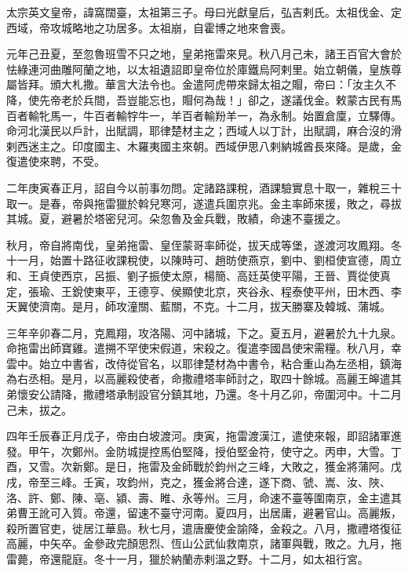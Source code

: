 
\begin{pinyinscope}

 太宗英文皇帝，諱窩闊臺，太祖第三子。母曰光獻皇后，弘吉剌氏。太祖伐金、定西域，帝攻城略地之功居多。太祖崩，自霍博之地來會喪。



 元年己丑夏，至忽魯班雪不只之地，皇弟拖雷來見。秋八月己未，諸王百官大會於怯綠連河曲雕阿蘭之地，以太祖遺詔即皇帝位於庫鐵烏阿剌里。始立朝儀，皇族尊屬皆拜。頒大札撒。華言大法令也。金遣阿虎帶來歸太祖之賵，帝曰：「汝主久不降，使先帝老於兵間，吾豈能忘也，賵何為哉！」卻之，遂議伐金。敕蒙古民有馬百者輸牝馬一，牛百者輸牸牛一，羊百者輸羒羊一，為永制。始置倉廩，立驛傳。命河北漢民以戶計，出賦調，耶律楚材主之；西域人以丁計，出賦調，麻合沒的滑剌西迷主之。印度國主、木羅夷國主來朝。西域伊思八剌納城酋長來降。是歲，金復遣使來聘，不受。



 二年庚寅春正月，詔自今以前事勿問。定諸路課稅，酒課驗實息十取一，雜稅三十取一。是春，帝與拖雷獵於斡兒寒河，遂遣兵圍京兆。金主率師來援，敗之，尋拔其城。夏，避暑於塔密兒河。朵忽魯及金兵戰，敗績，命速不臺援之。



 秋月，帝自將南伐，皇弟拖雷、皇侄蒙哥率師從，拔天成等堡，遂渡河攻鳳翔。冬十一月，始置十路征收課稅使，以陳時可、趙昉使燕京，劉中、劉桓使宣德，周立和、王貞使西京，呂振、劉子振使太原，楊簡、高廷英使平陽，王晉、賈從使真定，張瑜、王銳使東平，王德亨、侯顯使北京，夾谷永、程泰使平州，田木西、李天翼使濟南。是月，師攻潼關、藍關，不克。十二月，拔天勝寨及韓城、蒲城。



 三年辛卯春二月，克鳳翔，攻洛陽、河中諸城，下之。夏五月，避暑於九十九泉。命拖雷出師寶雞。遣搠不罕使宋假道，宋殺之。復遣李國昌使宋需糧。秋八月，幸雲中。始立中書省，改侍從官名，以耶律楚材為中書令，粘合重山為左丞相，鎮海為右丞相。是月，以高麗殺使者，命撒禮塔率師討之，取四十餘城。高麗王皞遣其弟懷安公請降，撒禮塔承制設官分鎮其地，乃還。冬十月乙卯，帝圍河中。十二月己未，拔之。



 四年壬辰春正月戊子，帝由白坡渡河。庚寅，拖雷渡漢江，遣使來報，即詔諸軍進發。甲午，次鄭州。金防城提控馬伯堅降，授伯堅金符，使守之。丙申，大雪。丁酉，又雪。次新鄭。是日，拖雷及金師戰於鈞州之三峰，大敗之，獲金將蒲阿。戊戌，帝至三峰。壬寅，攻鈞州，克之，獲金將合達，遂下商、虢、嵩、汝、陜、洛、許、鄭、陳、亳、潁、壽、睢、永等州。三月，命速不臺等圍南京，金主遣其弟曹王訛可入質。帝還，留速不臺守河南。夏四月，出居庸，避暑官山。高麗叛，殺所置官吏，徙居江華島。秋七月，遣唐慶使金諭降，金殺之。八月，撒禮塔復征高麗，中矢卒。金參政完顏思烈、恆山公武仙救南京，諸軍與戰，敗之。九月，拖雷薨，帝還龍庭。冬十一月，獵於納蘭赤剌溫之野。十二月，如太祖行宮。




\end{pinyinscope}
